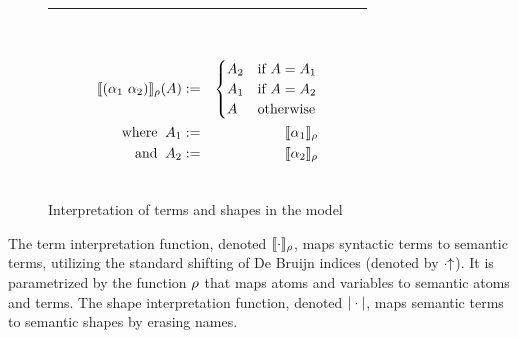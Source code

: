 \documentclass[english, mgr]{iithesis}
\begin{document}
\begin{figure}[htbp]
\begin{tabularx}{\textwidth}{|C|}
\begin{subfigure}{0.47\textwidth}
\begin{eqnarray*}
        & & \\
      \end{eqnarray*}
    \end{subfigure}
    \begin{subfigure}{0.43\textwidth}
      \begin{eqnarray*}
        \llbracket (\alpha_1\ \alpha_2) \rrbracket_{\rho}(A)  & := &
          \begin{cases}
            A_2 & \text{if } A = A_1 \\
            A_1 & \text{if } A = A_2 \\
            A   & \text{otherwise}
          \end{cases} \\
        \text{where }\: A_1 & := &  \llbracket \alpha_1 \rrbracket_{\rho} \\
        \text{  and }\: A_2 & := &  \llbracket \alpha_2 \rrbracket_{\rho} \\
      \end{eqnarray*}
    \end{subfigure}
    \\ \hline
  \end{tabularx}
  \caption{Interpretation of terms and shapes in the model}
  \label{fig:terms-shapes-interpretation}
\end{figure}
The term interpretation function, denoted $\llbracket \cdot \rrbracket_{\rho}$,
maps syntactic terms to semantic terms,
utilizing the standard shifting of De Bruijn indices (denoted by $\cdot\kern-3pt \uparrow$).
It is parametrized by the function $\rho$ that maps atoms and variables to
semantic atoms and terms.
The shape interpretation function, denoted $|\cdot|$,
maps semantic terms to semantic shapes by erasing names.
\end{document}
